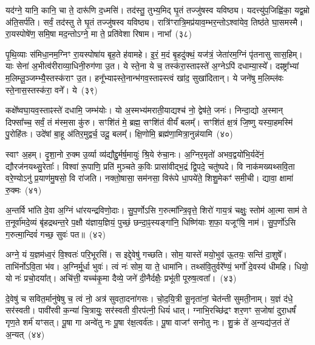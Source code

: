 यद॑ग्ने॒ यानि॒ कानि॒ चा ते॒ दारू॑णि द॒ध्मसि॑। तद॑स्तु॒ तुभ्य॒मिद् घृ॒तं तज्जु॑षस्व यविष्ठ्य। यदत्त्यु॑प॒जिह्वि॑का॒ यद्व॒म्रो अ॑ति॒सर्प॑ति। सर्वं॒ तद॑स्तु ते घृ॒तं तज्जु॑षस्व यविष्ठ्य। रात्रि॑ꣳरात्रि॒मप्र॑याव॒म्भर॒न्तो\-ऽश्वा॑येव॒ तिष्ठ॑ते घा॒समस्मै। रा॒यस्पोषे॑ण॒ समि॒षा मद॒न्तो\-ऽग्ने॒ मा ते॒ प्रति॑वेशा रिषाम। नाभा᳚~(३८)

पृ॒थि॒व्याः स॑मिधा॒नम॒ग्निꣳ रा॒यस्पोषा॑य बृह॒ते ह॑वामहे। इ॒रं॒ म॒दं बृ॒हदु॑क्थं॒ यज॑त्रं॒ जेता॑रम॒ग्निं पृ॑तनासु सास॒हिम्। याः सेना॑ अ॒भीत्व॑रीराव्या॒धिनी॒रुग॑णा उ॒त। ये स्ते॒ना ये च॒ तस्क॑रा॒स्ताꣴस्ते॑ अ॒ग्ने\-ऽपि॑ दधाम्या॒स्ये᳚। दꣴष्ट्रा᳚भ्यां म॒लिम्लू॒ञ्जम्भ्यै॒स्तस्क॑राꣳ उ॒त। हनू᳚भ्याꣴस्ते॒नान्भ॑गव॒स्ताꣴस्त्वं खा॑द॒ सुखा॑दितान्। ये जने॑षु म॒लिम्ल॑वः स्ते॒नास॒स्तस्क॑रा॒ वने᳚। ये~(३९)

कक्षे᳚ष्वघा॒यव॒स्ताꣴस्ते॑ दधामि॒ जम्भ॑योः। यो अ॒स्मभ्य॑मराती॒याद्यश्च॑ नो॒ द्वेष॑ते॒ जनः॑। निन्दा॒द्यो अ॒स्मान् दिफ्सा᳚च्च॒ सर्वं॒ तं म॑स्म॒सा कु॑रु। सꣳशि॑तं मे॒ ब्रह्म॒ सꣳशि॑तं वीर्यं॑ बलम्᳚। सꣳशि॑तं क्ष॒त्रं जि॒ष्णु यस्या॒हमस्मि॑ पु॒रोहि॑तः। उदे॑षां बा॒हू अ॑तिर॒मुद्वर्च॒ उदू॒ बलम्᳚। क्षि॒णोमि॒ ब्रह्म॑णा॒मित्रा॒नुन्न॑यामि~(४०)

स्वाꣳ अ॒हम्। दृ॒शा॒नो रु॒क्म उ॒र्व्या व्य॑द्यौद्दु॒र्मर्\mbox{}ष॒मायुः॑ श्रि॒ये रु॑चा॒नः। अ॒ग्निर॒मृतो॑ अभव॒द्वयो॑भि॒र्यदे॑नं॒ द्यौरज॑नयथ्सु॒रेताः᳚। विश्वा॑ रू॒पाणि॒ प्रति॑ मुञ्चते क॒विः प्रासा॑वीद्भ॒द्रं द्वि॒पदे॒ चतु॑ष्पदे। वि नाक॑मख्यथ्सवि॒ता वरे॒ण्यो\-ऽनु॑ प्र॒याण॑मु॒षसो॒ वि रा॑जति। नक्तो॒षासा॒ सम॑नसा॒ विरू॑पे धा॒पये॑ते॒ शिशु॒मेकꣳ॑ समी॒ची। द्यावा॒ क्षामा॑ रु॒क्मः~(४१)

अ॒न्तर्वि भा॑ति दे॒वा अ॒ग्निं धा॑रयन्द्रविणो॒दाः। सु॒प॒र्णो\-ऽसि ग॒रुत्मा᳚न्त्रि॒वृत्ते॒ शिरो॑ गाय॒त्रं चक्षुः॒ स्तोम॑ आ॒त्मा साम॑ ते त॒नूर्वा॑मदे॒व्यं बृ॑हद्रथन्त॒रे प॒क्षौ य॑ज्ञाय॒ज्ञियं॒ पुच्छं॒ छन्दा॒ꣴ॒स्यङ्गा॑नि॒ धिष्णि॑याः श॒फा॒ यजूꣳ॑षि॒ नाम॑। सु॒प॒र्णो॑\-ऽसि ग॒रुत्मा॒न्दिवं॑ गच्छ॒ सुवः॑ पत॥~(४२)

{\anuvakamend[{नाभा॒ वने॒ येन॑ यामि॒ क्षामा॑ रु॒क्मो᳚\-ऽष्टात्रिꣳ॑शच्च}]}%

अग्ने॒ यं य॒ज्ञम॑ध्व॒रं वि॒श्वतः॑ परि॒भूरसि॑। स इद्दे॒वेषु॑ गच्छति। सोम॒ यास्ते॑ मयो॒भुव॑ ऊ॒तयः॒ सन्ति॑ दा॒शुषे᳚। ताभि॑र्नो\-ऽवि॒ता भ॑व। अ॒ग्निर्मू॒र्धा भुवः॑। त्वं नः॑ सोम॒ या ते॒ धामा॑नि। तथ्स॑वि॒तुर्वरे᳚ण्यं॒ भर्गो॑ दे॒वस्य॑ धीमहि। धियो॒ यो नः॑ प्रचो॒दया᳚त्। अचि॑त्ती॒ यच्च॑कृ॒मा दैव्ये॒ जने॑ दी॒नैर्दक्षैः॒ प्रभू॑ती पूरुष॒त्वता᳚।~(४३)

दे॒वेषु॑ च सवित॒र्मानु॑षेषु च॒ त्वं नो॒ अत्र॑ सुवता॒दना॑गसः। चो॒द॒यि॒त्री सू॒नृता॑नां॒ चेत॑न्ती सुमती॒नाम्। य॒ज्ञं द॑धे॒ सर॑स्वती। पावी॑रवी क॒न्या॑ चि॒त्रायुः॒ सर॑स्वती वी॒रप॑त्नी॒ धियं॑ धात्। ग्नाभि॒रच्छि॑द्रꣳ शर॒णꣳ स॒जोषा॑ दुरा॒धर्\mbox{}षं॑ गृण॒ते शर्म॑ यꣳसत्। पू॒षा गा अन्वे॑तु नः पू॒षा र॑क्ष॒त्वर्व॑तः। पू॒षा वाजꣳ॑ सनोतु नः। शु॒क्रं ते॑ अ॒न्यद्य॑ज॒तं ते॑ अ॒न्यत्~(४४)

